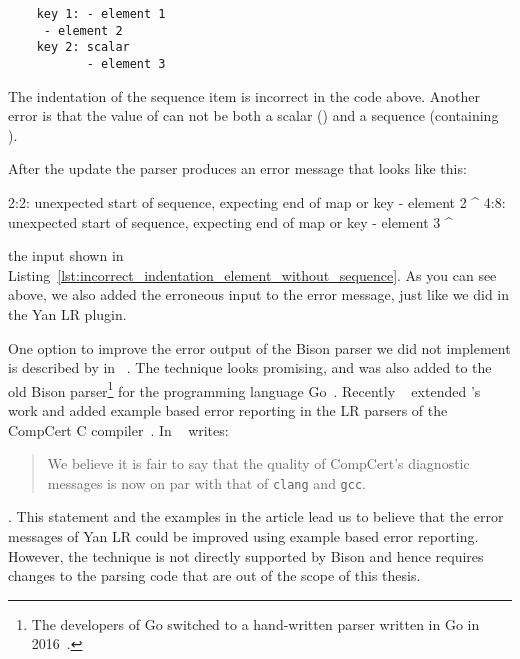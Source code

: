 \begin{listing}
  \begin{verbatim}
    key 1: - element 1
     - element 2
    key 2: scalar
           - element 3
  \end{verbatim}
  \caption{The indentation of the sequence item  is incorrect in the code above. Another error is that the value of  can not be both a scalar () and a sequence (containing ).}
  \label{lst:incorrect_indentation_element_without_sequence}
\end{listing}

After the update the parser produces an error message that looks like this:

\begin{textcode}
2:2: unexpected start of sequence, expecting end of map or key
      - element 2
      ^
4:8: unexpected start of sequence, expecting end of map or key
            - element 3
            ^
\end{textcode}

the input shown in Listing~\ref{lst:incorrect_indentation_element_without_sequence}. As you can see above, we also added the erroneous input to the error message, just like we did in the Yan LR plugin.

One option to improve the error output of the Bison parser we did not implement is described by \citeauthor{jeffery2003generating} in ~\cite{jeffery2003generating}. The technique looks promising, and was also added to the old Bison parser\footnote{The developers of Go switched to a hand-written parser written in Go in 2016~\cite{pike2017reddit, go2016release}.} for the programming language Go~\cite{cox2010errors}. Recently \citeauthor{pottier2016reachability}~\cite{pottier2016reachability} extended \citeauthor{jeffery2003generating}’s work and added example based error reporting in the LR parsers of the CompCert C compiler~\cite{kaestner2018compcert}. In  \citeauthor{pottier2016reachability}~\cite{pottier2016reachability} writes:

\begin{quote}
  We believe it is fair to say that the quality of CompCert’s diagnostic messages is now on par with that of \texttt{clang} and \texttt{gcc}.
\end{quote}

. This statement and the examples in the article lead us to believe that the error messages of Yan LR could be improved using example based error reporting. However, the technique is not directly supported by Bison and hence requires changes to the parsing code that are out of the scope of this thesis.

